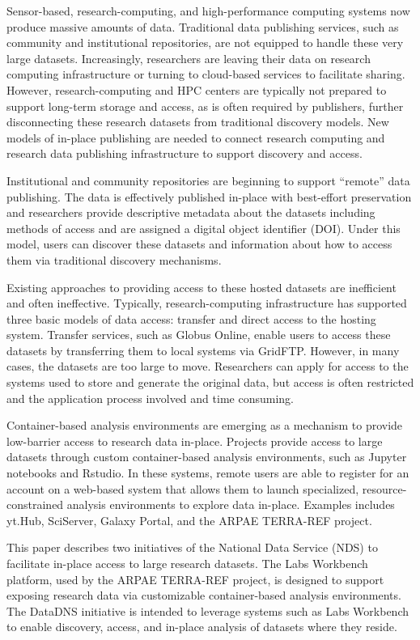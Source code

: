 \documentclass{sig-alternate}
\begin{document}
Sensor-based, research-computing, and high-performance computing systems now produce massive amounts of data.  Traditional data publishing services, such as community and institutional repositories, are not equipped to handle these very large datasets.  Increasingly, researchers are leaving their data on research computing infrastructure or turning to cloud-based services to facilitate sharing. However, research-computing and HPC centers are typically not prepared to support long-term storage and access, as is often required by publishers, further disconnecting these research datasets from traditional discovery models. New models of in-place publishing are needed to connect research computing and research data publishing infrastructure to support discovery and access.

Institutional and community repositories are beginning to support ``remote'' data publishing.  The data is effectively published in-place with best-effort preservation and  researchers provide descriptive metadata about the datasets including methods of access and are assigned a digital object identifier (DOI).  Under this model, users can discover these datasets and information about how to access them via traditional discovery mechanisms. 

Existing approaches to providing access to these hosted datasets are inefficient and often ineffective.  Typically, research-computing infrastructure has supported three basic models of data access: transfer and direct access to the hosting system.  Transfer services, such as Globus Online, enable users to access these datasets by transferring them to local systems via GridFTP.  However, in many cases, the datasets are too large to move. Researchers can apply for access to the systems used to store and generate the original data, but access is often restricted and the application process involved and time consuming.

Container-based analysis environments are emerging as a mechanism to provide low-barrier access to research data in-place.  Projects provide access to large datasets through custom container-based analysis environments, such as Jupyter notebooks and Rstudio.  In these systems, remote users are able to register for an account on a web-based system that allows them to launch specialized, resource-constrained analysis environments to explore data in-place.  Examples includes yt.Hub, SciServer, Galaxy Portal, and the ARPAE TERRA-REF project.

This paper describes two initiatives of the National Data Service (NDS) to facilitate in-place access to large research datasets. The Labs Workbench platform, used by the ARPAE TERRA-REF project, is designed to support exposing research data via customizable container-based analysis environments.  The DataDNS initiative is intended to leverage systems such as Labs Workbench to enable discovery, access, and in-place analysis of datasets where they reside.
\end{document}
